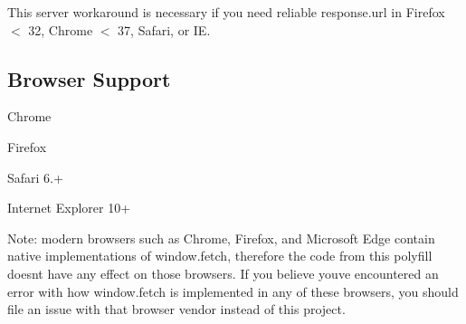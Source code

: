 This server workaround is necessary if you need reliable {\ttfamily response.\+url} in Firefox $<$ 32, Chrome $<$ 37, Safari, or IE.

\subsection*{Browser Support}


\begin{DoxyItemize}
\item Chrome
\item Firefox
\item Safari 6.+
\item Internet Explorer 10+
\end{DoxyItemize}

Note\+: modern browsers such as Chrome, Firefox, and Microsoft Edge contain native implementations of {\ttfamily window.\+fetch}, therefore the code from this polyfill doesn\textquotesingle{}t have any effect on those browsers. If you believe you\textquotesingle{}ve encountered an error with how {\ttfamily window.\+fetch} is implemented in any of these browsers, you should file an issue with that browser vendor instead of this project. 